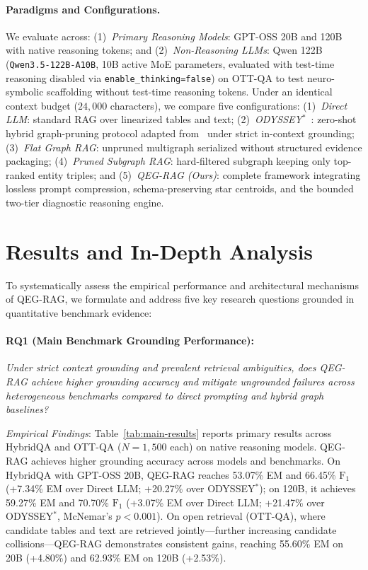 \documentclass[runningheads]{llncs}
\begin{document}
\paragraph{Paradigms and Configurations.}
We evaluate across: (1)~\emph{Primary Reasoning Models}: GPT-OSS 20B and 120B with native reasoning tokens; and (2)~\emph{Non-Reasoning LLMs}: Qwen 122B (\texttt{Qwen3.5-122B-A10B}, 10B active MoE parameters, evaluated with test-time reasoning disabled via \texttt{enable\_thinking=false}) on OTT-QA to test neuro-symbolic scaffolding without test-time reasoning tokens.
Under an identical context budget ($24{,}000$ characters), we compare five configurations:
(1)~\emph{Direct LLM}: standard RAG over linearized tables and text;
(2)~\emph{ODYSSEY$^*$}~\cite{agarwal2025hybrid}: zero-shot hybrid graph-pruning protocol adapted from~\cite{agarwal2025hybrid} under strict in-context grounding;
(3)~\emph{Flat Graph RAG}: unpruned multigraph serialized without structured evidence packaging;
(4)~\emph{Pruned Subgraph RAG}: hard-filtered subgraph keeping only top-ranked entity triples; and
(5)~\emph{QEG-RAG (Ours)}: complete framework integrating lossless prompt compression, schema-preserving star centroids, and the bounded two-tier diagnostic reasoning engine.

\section{Results and In-Depth Analysis}
\label{sec:results}
\enlargethispage{4.5\baselineskip}
To systematically assess the empirical performance and architectural mechanisms of QEG-RAG, we formulate and address five key research questions grounded in quantitative benchmark evidence:

\paragraph{RQ1 (Main Benchmark Grounding Performance):}
\emph{Under strict context grounding and prevalent retrieval ambiguities, does QEG-RAG achieve higher grounding accuracy and mitigate ungrounded failures across heterogeneous benchmarks compared to direct prompting and hybrid graph baselines?}

\emph{Empirical Findings}: Table~\ref{tab:main-results} reports primary results across HybridQA and OTT-QA ($N=1{,}500$ each) on native reasoning models. QEG-RAG achieves higher grounding accuracy across models and benchmarks. On HybridQA with GPT-OSS 20B, QEG-RAG reaches 53.07\% EM and 66.45\% $\text{F}_1$ (+7.34\% EM over Direct LLM; +20.27\% over ODYSSEY$^*$); on 120B, it achieves 59.27\% EM and 70.70\% $\text{F}_1$ (+3.07\% EM over Direct LLM; +21.47\% over ODYSSEY$^*$, McNemar's $p < 0.001$). On open retrieval (OTT-QA), where candidate tables and text are retrieved jointly---further increasing candidate collisions---QEG-RAG demonstrates consistent gains, reaching 55.60\% EM on 20B (+4.80\%) and 62.93\% EM on 120B (+2.53\%).
\end{document}
